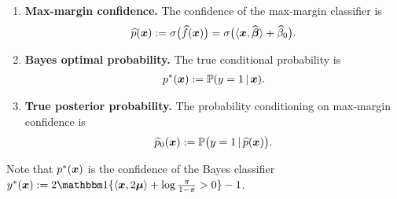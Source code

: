 \begin{enumerate}
    \item \textbf{Max-margin confidence.}
    The confidence of the max-margin classifier is
    \begin{equation*}
        \widehat p(\text{\boldmath $x$}) := \sigma\bigl( \widehat f(\text{\boldmath $x$}) \bigr) = 
        \sigma\bigl( \langle \text{\boldmath $x$}, \widehat{{\boldsymbol{\beta}}} \rangle + \widehat\beta_0 \bigr).
    \end{equation*}
    
    \item \textbf{Bayes optimal probability.}
    The true conditional probability is
    \begin{equation*}
        \begin{aligned}
            p^*(\text{\boldmath $x$}) := \mathbb{P}( y = 1 \,|\, \text{\boldmath $x$} ).
        \end{aligned}
    \end{equation*}
    
    \item \textbf{True posterior probability.} The probability conditioning on max-margin confidence is
    \begin{equation*}
        \begin{aligned}
            \widehat p_0(\text{\boldmath $x$}) := \mathbb{P} \bigl( y = 1 \,|\, \widehat p(\text{\boldmath $x$}) \bigr).
        \end{aligned}
    \end{equation*}
\end{enumerate}
Note that $p^*(\text{\boldmath $x$})$ is the confidence of the Bayes classifier $y^*(\xx) := 2\ind\{  \< \xx, 2\bmu \> + \log\frac{\pi}{1 - \pi} > 0 \} - 1$.

